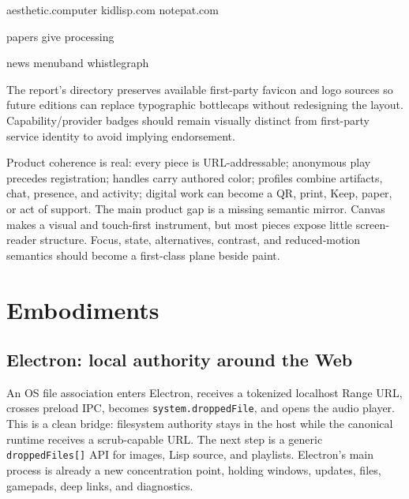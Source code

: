 \documentclass[10pt,letterpaper,twocolumn]{article}
\begin{document}
\begin{center}
\;\textsf{aesthetic.computer}\quad
{}\;\textsf{kidlisp.com}\quad
{}\;\textsf{notepat.com}\par\smallskip
{}\;\textsf{papers}\quad
{}\;\textsf{give}\quad
{}\;\textsf{processing}\par\smallskip
{}\;\textsf{news}\quad
{}\;\textsf{menuband}\quad
{}\;\textsf{whistlegraph}
\end{center}

The report's  directory preserves available first-party favicon and logo sources so future editions can replace typographic bottlecaps without redesigning the layout. Capability/provider badges should remain visually distinct from first-party service identity to avoid implying endorsement.

Product coherence is real: every piece is URL-addressable; anonymous play precedes registration; handles carry authored color; profiles combine artifacts, chat, presence, and activity; digital work can become a QR, print, Keep, paper, or act of support. The main product gap is a missing semantic mirror. Canvas makes a visual and touch-first instrument, but most pieces expose little screen-reader structure. Focus, state, alternatives, contrast, and reduced-motion semantics should become a first-class plane beside paint.

\section{Embodiments}

\subsection{Electron: local authority around the Web}

An OS file association enters Electron, receives a tokenized localhost Range URL, crosses preload IPC, becomes \texttt{system.droppedFile}, and opens the audio player. This is a clean bridge: filesystem authority stays in the host while the canonical runtime receives a scrub-capable URL. The next step is a generic \texttt{droppedFiles[]} API for images, Lisp source, and playlists. Electron's main process is already a new concentration point, holding windows, updates, files, gamepads, deep links, and diagnostics.
\end{document}
